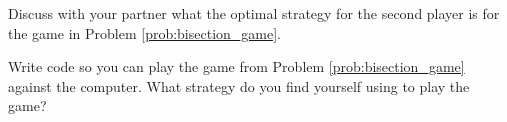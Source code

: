 \begin{problem}
    Discuss with your partner what the optimal strategy for the second player is for the
    game in Problem \ref{prob:bisection_game}.
\end{problem}

\begin{problem}
    Write \ProgLang code so you can play the game from Problem
    \ref{prob:bisection_game} against the computer.  
    What strategy do you find yourself using to play the
    game? 
\end{problem}



\newpage
